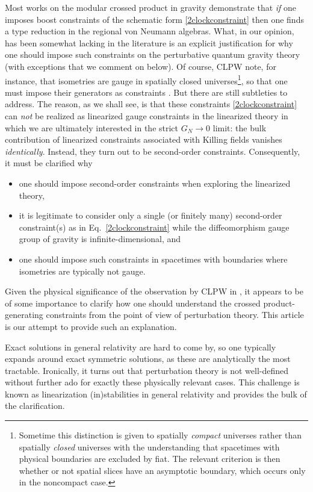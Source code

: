 \documentclass[]{jkpaper}
\theoremstyle{plain}
\theoremstyle{definition}
\begin{document}
Most works on the modular crossed product in gravity demonstrate that \emph{if} one imposes boost constraints of the schematic form \eqref{2clockconstraint} then one finds a type reduction in the regional von Neumann algebras.
What, in our opinion, has been somewhat lacking in the literature is an explicit justification for why one should impose such constraints on the perturbative quantum gravity theory (with  exceptions \cite{Jensen:2023yxy,Kudler-Flam:2023qfl,Kaplan:2024xyk} that we comment on below). Of course, CLPW note, for instance, that isometries are gauge in spatially closed universes\footnote{Sometime this distinction is given to spatially \textit{compact} universes rather than spatially \textit{closed} universes with the understanding that spacetimes with physical boundaries are excluded by fiat.  The relevant criterion is then whether or not spatial slices have an asymptotic boundary, which occurs only in the noncompact case.}, so that one must impose their generators as constraints \cite{Chandrasekaran:2022cip}. But there are still subtleties to address. The reason, as we shall see, is that these constraints \eqref{2clockconstraint} can \emph{not} be realized as linearized gauge constraints in the linearized theory in which we are ultimately interested in the strict $G_N\to0$ limit: the bulk contribution of linearized constraints associated with Killing fields vanishes \emph{identically}. Instead, they turn out to be second-order constraints. Consequently, it must be clarified why
\begin{itemize}
     \item[(a)] one should impose second-order constraints when exploring the linearized theory, 
    \item[(b)] it is legitimate to consider only a single (or finitely many) second-order constraint(s) as in Eq.~\eqref{2clockconstraint} while the diffeomorphism gauge group of gravity is infinite-dimensional, and
    \item[(c)] one should impose such constraints in spacetimes with boundaries where isometries are typically not gauge.
\end{itemize}
Given the physical significance of the observation by CLPW  in \cite{Chandrasekaran:2022cip}, it appears to be of some importance to clarify how one should understand the crossed product-generating constraints from the point of view of perturbation theory. This article is our attempt to provide such an explanation.  

Exact solutions in general relativity are hard to come by, so one typically expands around exact symmetric solutions, as these are analytically the most tractable. Ironically, it turns out that perturbation theory is not well-defined without further ado for exactly these physically relevant cases. This challenge is known as linearization (in)stabilities in general relativity \cite{fischer1980structure,Arms:1982ea,Marsden_lectures,Arms:1986vk,Deser:1973zza,Moncrief1,Moncrief:1976un,Arms1,Arms:1979au,fischer1980structure,Arms:1982ea,Saraykar:1981qm,Saraykar2,Deser:1973zzb,choquet1979maximal,Khavkine:2013iei,Altas:2019qcv} and provides the bulk of the clarification.
\end{document}
